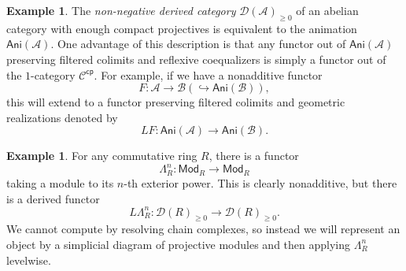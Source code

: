 \documentclass[10pt, oneside]{memoir}
\theoremstyle{definition}
\newtheorem{exm}[thm]{Example}
\theoremstyle{remark}
\theoremstyle{plain}
\theoremstyle{definition}
\theoremstyle{remark}
\newcommand{\mc}[1]{\mathcal{#1}}
\newcommand{\ms}[1]{\mathsf{#1}}
\newcommand{\1}{\mathbf{1}}
\newcommand{\2}{\mathbf{2}}
\newcommand{\3}{\mathbf{3}}
\begin{document}
\begin{exm}
    The \textit{non-negative derived category} $\mc{D}(\mc{A})_{\geq 0}$ of an abelian category with enough compact projectives is equivalent to the animation $\ms{Ani}(\mc{A})$. One advantage of this description is that any functor out of $\ms{Ani}(\mc{A})$ preserving filtered colimits and reflexive coequalizers is simply a functor out of the $1$-category $\mc{C}^{\ms{cp}}$. For example, if we have a nonadditive functor
    \[ F \colon \mc{A} \to \mc{B} (\hookrightarrow \ms{Ani}(\mc{B})), \]
    this will extend to a functor preserving filtered colimits and geometric realizations denoted by
    \[ LF \colon \ms{Ani}(\mc{A}) \to \ms{Ani}(\mc{B}). \]
\end{exm}

\begin{exm}
    For any commutative ring $R$, there is a functor
    \[ \Lambda_R^{n} \colon \ms{Mod}_R \to \ms{Mod}_R \]
    taking a module to its $n$-th exterior power. This is clearly nonadditive, but there is a derived functor
    \[ L \Lambda_R^n \colon \mc{D}(R)_{\geq 0} \to \mc{D}(R)_{\geq 0}. \]
    We cannot compute by resolving chain complexes, so instead we will represent an object by a simplicial diagram of projective modules and then applying $\Lambda_R^n$ levelwise.


\end{exm}
\end{document}
